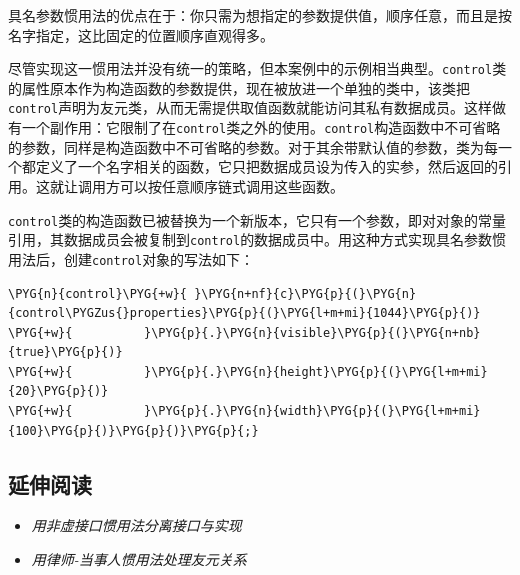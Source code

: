 
具名参数惯用法的优点在于：你只需为想指定的参数提供值，顺序任意，而且是按名字指定，这比固定的位置顺序直观得多。



尽管实现这一惯用法并没有统一的策略，但本案例中的示例相当典型。\texttt{control}类的属性原本作为构造函数的参数提供，现在被放进一个单独的类中，该类把\texttt{control}声明为友元类，从而无需提供取值函数就能访问其私有数据成员。这样做有一个副作用：它限制了在\texttt{control}类之外的使用。\texttt{control}构造函数中不可省略的参数，同样是构造函数中不可省略的参数。对于其余带默认值的参数，类为每一个都定义了一个名字相关的函数，它只把数据成员设为传入的实参，然后返回的引用。这就让调用方可以按任意顺序链式调用这些函数。



\texttt{control}类的构造函数已被替换为一个新版本，它只有一个参数，即对对象的常量引用，其数据成员会被复制到\texttt{control}的数据成员中。用这种方式实现具名参数惯用法后，创建\texttt{control}对象的写法如下：



\begin{codeblockbg}
\begin{Verbatim}[commandchars=\\\{\},breaklines=true,breakanywhere=true,fontsize=\codefont,xleftmargin=17bp]
\PYG{n}{control}\PYG{+w}{ }\PYG{n+nf}{c}\PYG{p}{(}\PYG{n}{control\PYGZus{}properties}\PYG{p}{(}\PYG{l+m+mi}{1044}\PYG{p}{)}
\PYG{+w}{          }\PYG{p}{.}\PYG{n}{visible}\PYG{p}{(}\PYG{n+nb}{true}\PYG{p}{)}
\PYG{+w}{          }\PYG{p}{.}\PYG{n}{height}\PYG{p}{(}\PYG{l+m+mi}{20}\PYG{p}{)}
\PYG{+w}{          }\PYG{p}{.}\PYG{n}{width}\PYG{p}{(}\PYG{l+m+mi}{100}\PYG{p}{)}\PYG{p}{)}\PYG{p}{;}
\end{Verbatim}
\end{codeblockbg}



\subsection{延伸阅读}



\begin{itemize}
\item \textit{用非虚接口惯用法分离接口与实现}



\item \textit{用律师-当事人惯用法处理友元关系}

\end{itemize}


